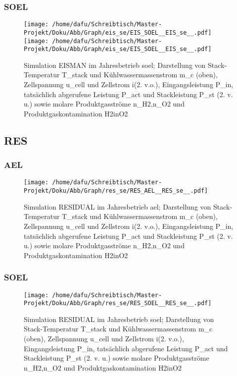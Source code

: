 \documentclass[onecolumn,10pt,titlepage]{article}
\begin{document}
\subsubsection{SOEL}
\begin{figure}[H]
	
	\centering
	\texttt{[image: /home/dafu/Schreibtisch/Master-Projekt/Doku/Abb/Graph/eis\_se/EIS\_SOEL\_\_EIS\_se\_\_.pdf]}
	\texttt{[image: /home/dafu/Schreibtisch/Master-Projekt/Doku/Abb/Graph/eis\_se/EIS\_SOEL\_\_EIS\_se\_\_.pdf]}
	
	\caption[Simulation EISMAN im Jahresbetrieb \gls{soel}]{Simulation EISMAN im Jahresbetrieb \gls{soel}; Darstellung von Stack-Temperatur \gls{T_stack} und Kühlwassermassenstrom \gls{m_c} (oben), Zellspannung \gls{u_cell} und Zellstrom \gls{i}(2. v.o.), Eingangsleistung \gls{P_in},  tatsächlich abgerufene Leistung \gls{P_act} und Stackleistung \gls{P_st} (2. v. u.) sowie molare Produktgasströme \gls{n_H2},\gls{n_O2} und Produktgaskontamination \gls{H2inO2}}
	\label{fig:plt_se_EIS_SOEL} 
\end{figure}
\subsection{RES}
\subsubsection{AEL}
\begin{figure}[H]
	\centering
	\texttt{[image: /home/dafu/Schreibtisch/Master-Projekt/Doku/Abb/Graph/res\_se/RES\_AEL\_\_RES\_se\_\_.pdf]}
	
	\caption[Simulation RESIDUAL im Jahresbetrieb \gls{ael}]{Simulation RESIDUAL im Jahresbetrieb \gls{ael}; Darstellung von Stack-Temperatur \gls{T_stack} und Kühlwassermassenstrom \gls{m_c} (oben), Zellspannung \gls{u_cell} und Zellstrom \gls{i}(2. v.o.), Eingangsleistung \gls{P_in},  tatsächlich abgerufene Leistung \gls{P_act} und Stackleistung \gls{P_st} (2. v. u.) sowie molare Produktgasströme \gls{n_H2},\gls{n_O2} und Produktgaskontamination \gls{H2inO2}}
	\label{fig:plt_se_RES_AEL} 
\end{figure}

\subsubsection{SOEL}
\begin{figure}[H]
	
	\centering
	\texttt{[image: /home/dafu/Schreibtisch/Master-Projekt/Doku/Abb/Graph/res\_se/RES\_SOEL\_\_RES\_se\_\_.pdf]}
	\caption[Simulation RESIDUAL im Jahresbetrieb \gls{soel}]{Simulation RESIDUAL im Jahresbetrieb \gls{soel}; Darstellung von Stack-Temperatur \gls{T_stack} und Kühlwassermassenstrom \gls{m_c} (oben), Zellspannung \gls{u_cell} und Zellstrom \gls{i}(2. v.o.), Eingangsleistung \gls{P_in},  tatsächlich abgerufene Leistung \gls{P_act} und Stackleistung \gls{P_st} (2. v. u.) sowie molare Produktgasströme \gls{n_H2},\gls{n_O2} und Produktgaskontamination \gls{H2inO2}}
	\label{fig:plt_se_RES_SOEL} 
\end{figure}
\end{document}
